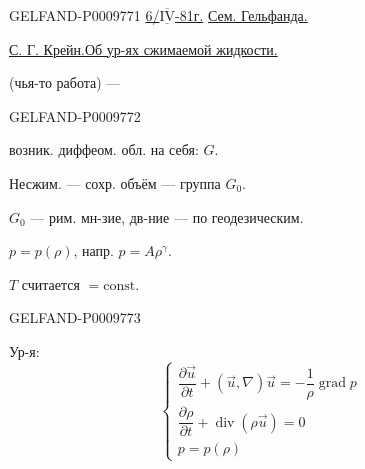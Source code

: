 \begin{GelfandAdjacentEvidence}{GELFAND-P000977}{1}
\underline{6/\(\underline{\overline{\mathrm{IV}}}\)-81г.}\qquad
\underline{Сем. Гельфанда.}

\underline{\underline{С. Г. Крейн.}}\qquad \underline{Об ур-ях сжимаемой жидкости.}

(чья-то работа) --- 

\end{GelfandAdjacentEvidence}
\begin{GelfandAdjacentEvidence}{GELFAND-P000977}{2}

возник. диффеом. обл. на себя: $G$.

Несжим. --- сохр. объём --- группа $G_0$.

$G_0$ --- рим. мн-зие, дв-ние --- по геодезическим.

 $p=p(\rho)$, напр. $p=A\rho^\gamma$.

$T$ считается $=\mathrm{const}$.
\end{GelfandAdjacentEvidence}
\begin{GelfandAdjacentEvidence}{GELFAND-P000977}{3}


Ур-я:
\begin{equation*}
\begin{cases}
 \dfrac{\partial\vec u}{\partial t}+(\vec u,\nabla)\vec u
 =-\dfrac1{\rho}\operatorname{grad}p\\[4pt]
 \dfrac{\partial\rho}{\partial t}+\operatorname{div}(\rho\vec u)=0\\
 p=p(\rho)
\end{cases}
\tag{1}
\end{equation*}
\end{GelfandAdjacentEvidence}
